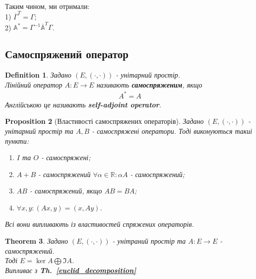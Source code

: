 \documentclass[a4paper, 10pt]{article}
\theoremstyle{theoremdd}
\newtheorem{theorem}{Theorem}[subsection]
\newtheorem{definition}[theorem]{Definition}
\newtheorem{proposition}[theorem]{Proposition}
\newtheorem{remark}[theorem]{Remark}
\newcommand\thref[1]{\textbf{Th.~\ref{#1}}}
\begin{document}
\bigskip \\
Таким чином, ми отримали:\\
1) $\overline{\Gamma}^T = \Gamma$;\\
2) $\mathbb{A^*} = \Gamma^{-1} \mathbb{\overline{A}}^T \Gamma$.

\iffalse
\begin{remark}
Тепер в евкілдовому просторі нехай $\{e_1,\dots,e_n\}$ - ортонормований базис. Тоді $\Gamma = \mathbb{I}$, а отже, $\mathbb{A^*} = \mathbb{\overline{A}}^T$.
\end{remark}
\fi

\subsection{Самоспряжений оператор}
\begin{definition}
Задано $(E,(\cdot,\cdot))$ - унітарний простір.\\
Лінійний оператор $A \colon E \to E$ називають \textbf{самоспряженим}, якщо
\begin{align*}
A^* = A
\end{align*}
Англійською це називають \textbf{self-adjoint operator}.
\end{definition}

\begin{proposition}[Властивості самоспряжених операторів]
Задано $(E,(\cdot,\cdot))$ - унітарний простір та $A,B$ - самоспряжені оператори. Тоді виконуються такиі пункти:
\begin{enumerate}[nosep,wide=0pt,label={\arabic*)},start=0]
\item $I$ та $O$ - самоспряжені;
\item $A+B$ - самоспряжений \qquad $\forall \alpha \in \mathbb{R}: \alpha A$ - самоспряжений;
\item $AB$ - самоспряжений, якщо $AB = BA$;
\item $\forall x,y: (Ax,y) = (x,Ay)$.
\end{enumerate}
\textit{Всі вони випливають із властивостей спряжених операторів.}
\end{proposition}

\begin{theorem}
\label{euclid_decomposition_2}
Задано $(E,(\cdot,\cdot))$ - унітраний простір та $A \colon E \to E$ - самоспряжений.\\
Тоді $E = \ker A \bigoplus \Im A$.\\
\textit{Випливає з } \thref{euclid_decomposition}
\end{theorem}
\end{document}
